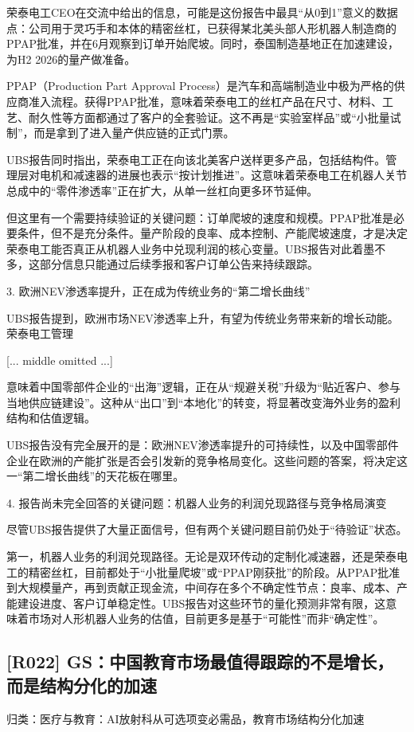 \documentclass[11pt]{ctexart}
\begin{document}
荣泰电工CEO在交流中给出的信息，可能是这份报告中最具“从0到1”意义的数据点：公司用于灵巧手和本体的精密丝杠，已获得某北美头部人形机器人制造商的PPAP批准，并在6月观察到订单开始爬坡。同时，泰国制造基地正在加速建设，为H2 2026的量产做准备。

PPAP（Production Part Approval Process）是汽车和高端制造业中极为严格的供应商准入流程。获得PPAP批准，意味着荣泰电工的丝杠产品在尺寸、材料、工艺、耐久性等方面都通过了客户的全套验证。这不再是“实验室样品”或“小批量试制”，而是拿到了进入量产供应链的正式门票。

UBS报告同时指出，荣泰电工正在向该北美客户送样更多产品，包括结构件。管理层对电机和减速器的进展也表示“按计划推进”。这意味着荣泰电工在机器人关节总成中的“零件渗透率”正在扩大，从单一丝杠向更多环节延伸。

但这里有一个需要持续验证的关键问题：订单爬坡的速度和规模。PPAP批准是必要条件，但不是充分条件。量产阶段的良率、成本控制、产能爬坡速度，才是决定荣泰电工能否真正从机器人业务中兑现利润的核心变量。UBS报告对此着墨不多，这部分信息只能通过后续季报和客户订单公告来持续跟踪。

3. 欧洲NEV渗透率提升，正在成为传统业务的“第二增长曲线”

UBS报告提到，欧洲市场NEV渗透率上升，有望为传统业务带来新的增长动能。荣泰电工管理

[... middle omitted ...]

意味着中国零部件企业的“出海”逻辑，正在从“规避关税”升级为“贴近客户、参与当地供应链建设”。这种从“出口”到“本地化”的转变，将显著改变海外业务的盈利结构和估值逻辑。

UBS报告没有完全展开的是：欧洲NEV渗透率提升的可持续性，以及中国零部件企业在欧洲的产能扩张是否会引发新的竞争格局变化。这些问题的答案，将决定这一“第二增长曲线”的天花板在哪里。

4. 报告尚未完全回答的关键问题：机器人业务的利润兑现路径与竞争格局演变

尽管UBS报告提供了大量正面信号，但有两个关键问题目前仍处于“待验证”状态。

第一，机器人业务的利润兑现路径。无论是双环传动的定制化减速器，还是荣泰电工的精密丝杠，目前都处于“小批量爬坡”或“PPAP刚获批”的阶段。从PPAP批准到大规模量产，再到贡献正现金流，中间存在多个不确定性节点：良率、成本、产能建设进度、客户订单稳定性。UBS报告对这些环节的量化预测非常有限，这意味着市场对人形机器人业务的估值，目前更多是基于“可能性”而非“确定性”。

\subsection{[R022] GS：中国教育市场最值得跟踪的不是增长，而是结构分化的加速}
{\small\color{refgray}归类：医疗与教育：AI放射科从可选项变必需品，教育市场结构分化加速}
\end{document}
